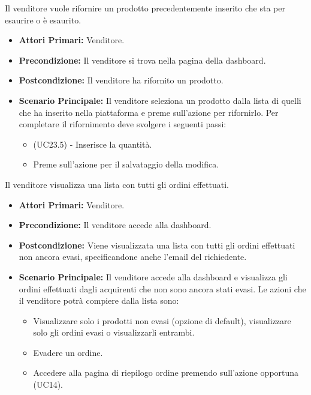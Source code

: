 Il venditore vuole rifornire un prodotto precedentemente inserito che sta per esaurire o è esaurito.
\begin{itemize}
    \item \textbf{Attori Primari:} Venditore.
    \item \textbf{Precondizione:} Il venditore si trova nella pagina della dashboard.
    \item \textbf{Postcondizione:} Il venditore ha rifornito un prodotto.
    \item \textbf{Scenario Principale:} Il venditore seleziona un prodotto dalla lista di quelli che ha inserito nella piattaforma e preme sull'azione per rifornirlo. Per completare il rifornimento deve svolgere i seguenti passi:
    \begin{itemize}
        \item (UC23.5) - Inserisce la quantità.
        \item Preme sull'azione per il salvataggio della modifica.
    \end{itemize}
\end{itemize}

Il venditore visualizza una lista con tutti gli ordini effettuati.
\begin{itemize}
    \item \textbf{Attori Primari:} Venditore.
    \item \textbf{Precondizione:} Il venditore accede alla dashboard.
    \item \textbf{Postcondizione:} Viene visualizzata una lista con tutti gli ordini effettuati non ancora evasi, specificandone anche l'email del richiedente.
    \item \textbf{Scenario Principale:} Il venditore accede alla dashboard e visualizza gli ordini effettuati dagli acquirenti che non sono ancora stati evasi. Le azioni che il venditore potrà compiere dalla lista sono: 
    \begin{itemize}
        \item Visualizzare solo i prodotti non evasi (opzione di default), visualizzare solo gli ordini evasi o visualizzarli entrambi.
        \item Evadere un ordine.
        \item Accedere alla pagina di riepilogo ordine premendo sull'azione opportuna (UC14).
    \end{itemize}
\end{itemize}
